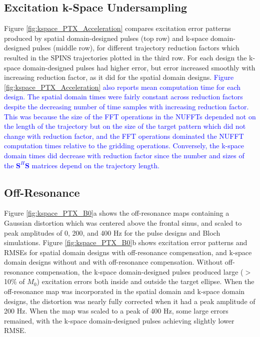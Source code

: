 \subsection*{Excitation k-Space Undersampling}
Figure \ref{fig:kspace_PTX_Acceleration} compares excitation error patterns produced by spatial domain-designed pulses (top row)
and k-space domain-designed pulses (middle row),
for different trajectory reduction factors which resulted in the SPINS trajectories plotted in the third row. 
For each design the k-space domain-designed pulses had higher error, 
but error increased smoothly with increasing reduction factor, 
as it did for the spatial domain designs. 
\textcolor{blue}{Figure \ref{fig:kspace_PTX_Acceleration} also reports mean computation time for each design.
The spatial domain times were fairly constant across reduction factors despite the decreasing number of time samples with increasing reduction factor.
This was because the size of the FFT operations in the NUFFTs 
depended not on the length of the trajectory but on the size of the target pattern which did not change with reduction factor,
and the FFT operations dominated the NUFFT computation times relative to the gridding operations. %
Conversely, the k-space domain times did decrease with reduction factor since the number and sizes of the $\bm{S}^H\bm{S}$
matrices depend on the trajectory length.} 



\subsection*{Off-Resonance}
Figure \ref{fig:kspace_PTX_B0}a shows the off-resonance maps containing a Gaussian distortion which was centered above the frontal sinus,
and scaled to peak amplitudes of 0, 200, and 400 Hz for the pulse designs and Bloch simulations. 
Figure \ref{fig:kspace_PTX_B0}b shows excitation error patterns and RMSEs for spatial domain designs with off-resonance compensation,
and k-space domain designs without and with off-resonance compensation. 
Without off-resonance compensation, 
the k-space domain-designed pulses produced large ($>$ 10\% of $M_0$) excitation errors both inside and outside the target ellipse. 
When the off-resonance map was incorporated in the spatial domain and k-space domain designs, 
the distortion was nearly fully corrected when it had a peak amplitude of 200 Hz. 
When the map was scaled to a peak of 400 Hz, some large errors remained, with the k-space domain-designed pulses achieving slightly lower RMSE. 
